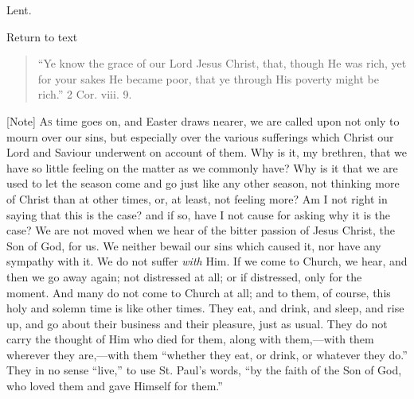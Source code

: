 
Lent.

Return to text


\begin{quote}

``Ye know the grace of our Lord Jesus Christ, that, though He
was rich, yet for your sakes He became poor, that ye through His
poverty might be rich.'' 2 Cor. viii. 9.

\end{quote}

[Note] A\textsc{s} time goes on, and Easter
draws nearer, we are called upon not only to mourn over our sins, but
especially over the various sufferings which Christ our Lord and Saviour
underwent on account of them. Why is it, my brethren, that we have so
little feeling on the matter as we commonly have? Why is it that we are
used to let the season come and go just like any other season, not
thinking more of Christ than at other times, or, at least, not feeling
more? Am I not right in saying that this is the case? and if so, have I
not cause for asking why it is the case? We are not moved when we hear
of the bitter passion of Jesus Christ, the Son of God, for us. We
neither bewail our sins which caused it, nor have any sympathy with it.
We do not suffer \emph{with} Him. If we come to Church, we hear, and then we go
away again; not distressed at all; or if distressed, only for the
moment. And many do not come to Church at all; and to them, of course,
this holy and solemn time is like other times. They eat, and drink, and
sleep, and rise up, and go about their business and their pleasure, just
as usual. They do not carry the thought of Him who died for them, along
with them,—with them wherever they are,—with them ``whether they
eat, or drink, or whatever they do.'' They in no sense
``live,'' to use St. Paul's words, ``by the faith of the Son
of God, who loved them and gave Himself for them.''

